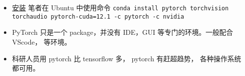 

\begin{itemize}
\item \href{https://pytorch.org/get-started/locally/}{安装} 笔者在 Ubuntu 中使用命令 \verb|conda install pytorch torchvision torchaudio pytorch-cuda=12.1 -c pytorch -c nvidia|
\item PyTorch 只是一个 package，并没有 IDE，GUI 等专门的环境。一般配合 VScode， 等环境。
\item 科研人员用 pytorch 比 tensorflow 多， pytorch 有赶超趋势， 各种操作系统都可用。
\end{itemize}
